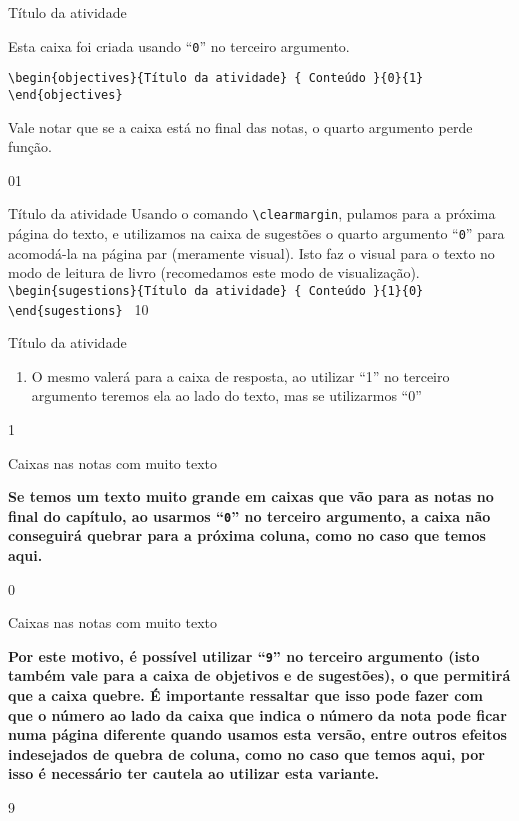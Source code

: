 \begin{objectives}{Título da atividade}
{
Esta caixa foi criada usando ``\texttt{0}'' no terceiro argumento.

\texttt{\textbackslash begin\{objectives\}\{Título da atividade\}\newline
\{\newline
Conteúdo\newline
\}\{0\}\{1\}\newline
\textbackslash end\{objectives\}
}

Vale notar que se a caixa está no final das notas, o quarto argumento perde função.
}{0}{1}
\end{objectives}
\clearmargin
\begin{sugestions}{Título da atividade}
{
Usando o comando \texttt{\textbackslash clearmargin}, pulamos para a próxima página do texto, e utilizamos na caixa de sugestões o quarto argumento ``\texttt{0}'' para acomodá-la na página par (meramente visual). Isto faz o visual para o texto no modo de leitura de livro (recomedamos este modo de visualização).
\texttt{\textbackslash begin\{sugestions\}\{Título da atividade\}\newline
\{\newline
Conteúdo\newline
\}\{1\}\{0\}\newline
\textbackslash end\{sugestions\}
}
}{1}{0}
\end{sugestions}
\begin{answer}{Título da atividade}
{
\begin{enumerate}
\item O mesmo valerá para a caixa de resposta, ao utilizar ``1'' no terceiro argumento teremos ela ao lado do texto, mas se utilizarmos ``0''
\end{enumerate}
}{1}
\end{answer}

\begin{answer}{Caixas nas notas com muito texto}
{
\textbf{Se temos um texto muito grande em caixas que vão para as notas no final do capítulo, ao usarmos ``\texttt{0}'' no terceiro argumento, a caixa não conseguirá quebrar para a próxima coluna, como no caso que temos aqui.}

\lipsum
}{0}
\end{answer}

\begin{answer}{Caixas nas notas com muito texto}
{
\textbf{Por este motivo, é possível utilizar ``\texttt{9}'' no terceiro argumento (isto também vale para a caixa de objetivos e de sugestões), o que permitirá que a caixa quebre. É importante ressaltar que isso pode fazer com que o número ao lado da caixa que indica o número da nota pode ficar numa página diferente quando usamos esta versão, entre outros efeitos indesejados de quebra de coluna, como no caso que temos aqui, por isso é necessário ter cautela ao utilizar esta variante.}

\lipsum
}{9}
\end{answer}


